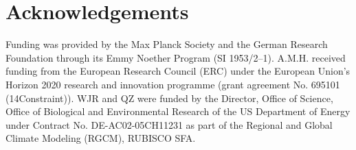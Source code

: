 \documentclass[11pt,a4paper]{article}
\begin{document}
\section*{Acknowledgements}
Funding was provided by the Max Planck Society and the German Research Foundation through its Emmy Noether Program (SI 1953/2--1). A.M.H. received funding from the European Research Council (ERC) under the European Union’s Horizon 2020 research and innovation programme (grant agreement No. 695101 (14Constraint)). WJR and QZ were funded by the Director, Office of Science, Office of Biological and Environmental Research of the US Department of Energy under Contract No. DE-AC02-05CH11231 as part of the Regional and Global Climate Modeling (RGCM), RUBISCO SFA.


%

\end{document}
